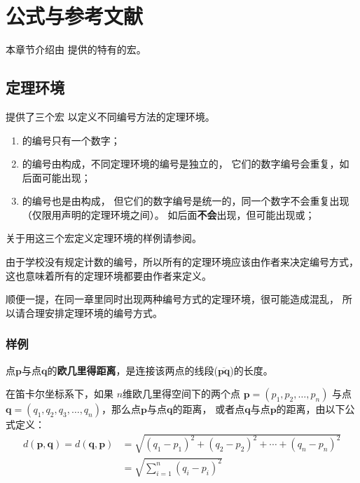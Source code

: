 
\chapter{公式与参考文献}

本章节介绍由 \nwafuthesis{} 提供的特有的宏。

\section{定理环境}

\nwafuthesis{} 提供了三个宏  以定义不同编号方法的定理环境。
\begin{enumerate}
  \item {} 的编号只有一个数字；
  \item {} 的编号由构成，不同定理环境的编号是独立的，
  它们的数字编号会重复，如后面可能出现；
  \item {} 的编号也是由构成，
  但它们的数字编号是统一的，同一个数字不会重复出现（仅限用声明的定理环境之间）。
  如后面\textbf{不会}出现，但可能出现或；
\end{enumerate}

关于用这三个宏定义定理环境的样例请参阅。

由于学校没有规定计数的编号，所以所有的定理环境应该由作者来决定编号方式，
这也意味着所有的定理环境都要由作者来定义。

顺便一提，在同一章里同时出现两种编号方式的定理环境，很可能造成混乱，
所以请合理安排定理环境的编号方式。

\subsection*{样例}

\begin{definition}[欧几里得距离]
\label{def:distance}
点$\mathbf{p}$与点$\mathbf{q}$的\textbf{欧几里得距离}，是连接该两点的线段($\overline{\mathbf{pq}}$)的长度。

在笛卡尔坐标系下，如果 $n$维欧几里得空间下的两个点 $\mathbf{p}=(p_1, p_2, \dots, p_n)$ 与点
$\mathbf{q} = (q_1, q_2, q_3, \dots, q_n)$，那么点$\mathbf{p}$与点$\mathbf{q}$的距离，
或者点$\mathbf{q}$与点$\mathbf{p}$的距离，由以下公式定义：
\begin{align}
\label{equ:1}
d(\mathbf{p},\mathbf{q}) = d(\mathbf{q},\mathbf{p}) & = \sqrt{(q_1-p_1)^2 + (q_2-p_2)^2 + \cdots + (q_n-p_n)^2} \\
\label{equ:2}
& = \sqrt{\sum_{i=1}^n (q_i-p_i)^2}
\end{align}
\end{definition}

